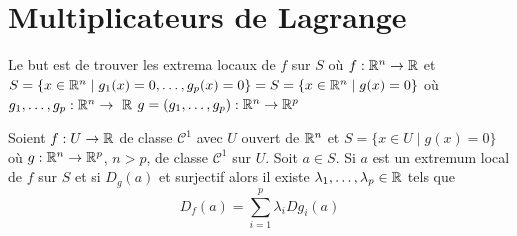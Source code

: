 \section{Multiplicateurs de Lagrange}
Le but est de trouver les extrema locaux de $f$ sur $S$ où $f : \mathbb{R}^n \to \mathbb{R}$ et $S = \{x\in\mathbb{R}^n\mid g_1(x) = 0,\dotsc, g_p(x) = 0\} = S = \{x\in\mathbb{R}^n\mid g(x) = 0\}$
où $g_1,\dots,g_p : \mathbb{R}^n \to \ \mathbb{R}$
$g = (g_1,\dots,g_p): \mathbb{R}^n \to \mathbb{R}^p$
\begin{theoreme}
    Soient $f: U \to \mathbb{R}$ de classe $\mathcal C^1$ avec $U$ ouvert de $\mathbb{R}^n$
    et $S = \{x\in U\mid g(x) = 0\}$ où $g:\mathbb{R}^n\to\mathbb{R}^p$, $n>p$, de classe $\mathcal C^1$ sur $U$. Soit $a\in S$. 
Si $a$ est un extremum local de $f$ sur $S$ et si $D_g(a)$ et surjectif alors il existe $\lambda_1,\dotsc,\lambda_p\in\mathbb{R}$ tels que 
$$ D_f(a) = \sum_{i = 1}^p  \lambda_iDg_i(a)$$
\end{theoreme}

